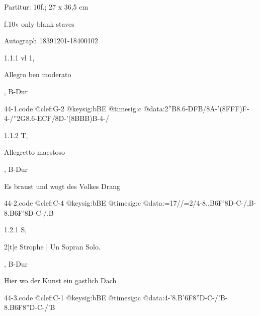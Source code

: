 \documentclass[a4paper, twocolumn, 11pt]{book}
\begin{document}
\par \textcolor{darkblue}{}  Partitur: 10f.; 27 x 36,5 cm\newline \begin{small} f.10v only blank staves\end{small} \newline Autograph  18391201-18400102
\par 1.1.1  vl 1, \begin{itshape}Allegro ben moderato\end{itshape}, B-Dur  
\begin{filecontents*}{44-1.code}
@clef:G-2
@keysig:bBE
@timesig:c
@data:2''B8.6-{DFB}/8A-'({8FFF})F-4-/''2G8.6-{ECF}/8D-'(8{BBB})B-4-/
\end{filecontents*}
\newline %
\par 1.1.2  T, \begin{itshape}Allegretto maestoso\end{itshape}, B-Dur\newline \begin{footnotesize} Es braust und wogt des Volkes Drang \end{footnotesize}  
\begin{filecontents*}{44-2.code}
@clef:C-4
@keysig:bBE
@timesig:c
@data:=17//=2/4-{8.,B6F}'8D-C-/,B-{8.B6F}'8D-C-/,B
\end{filecontents*}
\newline %
\par 1.2.1  S, \begin{itshape}2|t|e Strophe | Un Sopran Solo.\end{itshape}, B-Dur\newline \begin{footnotesize} Hier wo der Kunst ein gastlich Dach \end{footnotesize}  
\begin{filecontents*}{44-3.code}
@clef:C-1
@keysig:bBE
@timesig:c
@data:4-'{8.B'6F}8''D-C-/'B-{8.B6F}8''D-C-/'B
\end{filecontents*}
\end{document}
